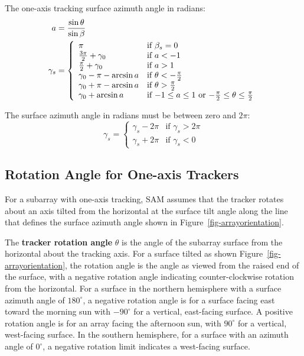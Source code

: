 \documentclass[12pt,letterpaper]{article}
\begin{document}
The one-axis tracking surface azimuth angle in radians:
\begin{align}
a & = \frac{\sin\theta}{\sin\beta}\notag\\
\gamma_s &= \left\{
\begin{array}{ll}
\pi & \text{if $\beta_s=0$}\\
\frac{3\pi}{2} + \gamma_0 & \text{if $a<-1$}\\
\frac{\pi}{2} + \gamma_0 & \text{if $a>1$}\\
\gamma_0 - \pi - \arcsin{a} & \text{if $\theta < -\frac{\pi}{2}$}\\
\gamma_0 + \pi - \arcsin{a} & \text{if $\theta > \frac{\pi}{2}$}\\
\gamma_0 + \arcsin{a} & \text{if $-1 \leq a \leq 1$ or $-\frac{\pi}{2} \leq \theta \leq \frac{\pi}{2}$}
\end{array}
\right.
\end{align}

The surface azimuth angle in radians must be between zero and $2\pi$:
\begin{equation}
\gamma_s = \left\{
\begin{array}{ll}
\gamma_s - 2\pi & \text{if $\gamma_s > 2\pi$}\\
\gamma_s + 2\pi & \text{if $\gamma_s < 0$}
\end{array}
\right.
\end{equation}

\subsection{Rotation Angle for One-axis Trackers}\label{sec-rot1x}

For a subarray with one-axis tracking, SAM assumes that the tracker rotates about an axis tilted from the horizontal at the surface tilt angle along the line that defines the surface azimuth angle shown in Figure~\ref{fig-arrayorientation}. 

The \textbf{tracker rotation angle} $\theta$ is the angle of the subarray surface from the horizontal about the tracking axis. For a surface tilted as shown Figure~\ref{fig-arrayorientation}, the rotation angle is the angle as viewed from the raised end of the surface, with a negative rotation angle indicating counter-clockwise rotation from the horizontal. For a surface in the northern hemisphere with a surface azimuth angle of $180^\circ$, a negative rotation angle is for a surface facing east toward the morning sun with $-90^\circ$ for a vertical, east-facing surface. A positive rotation angle is for an array facing the afternoon sun, with $90^\circ$ for a vertical, west-facing surface.  In the southern hemisphere, for a surface with an azimuth angle of $0^\circ$, a negative rotation limit indicates a west-facing surface.
\end{document}
